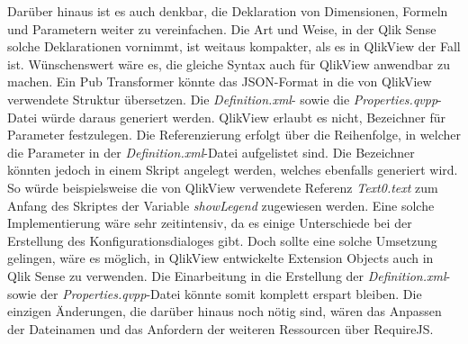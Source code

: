 Darüber hinaus ist es auch denkbar, die Deklaration von Dimensionen, Formeln und Parametern weiter zu vereinfachen. Die Art und Weise, in der Qlik Sense solche Deklarationen vornimmt, ist weitaus kompakter, als es in QlikView der Fall ist. Wünschenswert wäre es, die gleiche Syntax auch für QlikView anwendbar zu machen. Ein Pub Transformer könnte das JSON-Format in die von QlikView verwendete Struktur übersetzen. Die \textit{Definition.xml}- sowie die \textit{Properties.qvpp}-Datei würde daraus generiert werden. QlikView erlaubt es nicht, Bezeichner für Parameter festzulegen. Die Referenzierung erfolgt über die Reihenfolge, in welcher die Parameter in der \textit{Definition.xml}-Datei aufgelistet sind. Die Bezeichner könnten jedoch in einem Skript angelegt werden, welches ebenfalls generiert wird. So würde beispielsweise die von QlikView verwendete Referenz \textit{Text0.text} zum Anfang des Skriptes der Variable \textit{showLegend} zugewiesen werden. Eine solche Implementierung wäre sehr zeitintensiv, da es einige Unterschiede bei der Erstellung des Konfigurationsdialoges gibt. Doch sollte eine solche Umsetzung gelingen, wäre es möglich, in QlikView entwickelte Extension Objects auch in Qlik Sense zu verwenden. Die Einarbeitung in die Erstellung der \textit{Definition.xml}- sowie der \textit{Properties.qvpp}-Datei könnte somit komplett erspart bleiben. Die einzigen Änderungen, die darüber hinaus noch nötig sind, wären das Anpassen der Dateinamen und das Anfordern der weiteren Ressourcen über RequireJS.